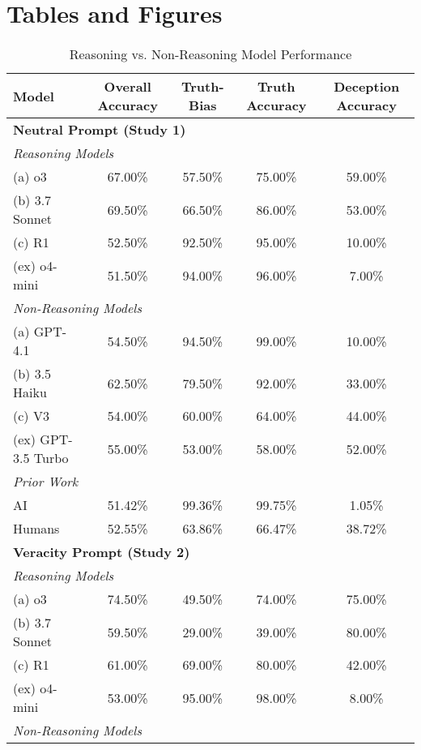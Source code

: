 \documentclass{article}
\begin{document}
\section{Tables and Figures}
\begin{table}[ht]
\centering
\small
\caption{Reasoning vs. Non-Reasoning Model Performance}
\begin{tabular}{lcccc}
\toprule
\textbf{Model} & \textbf{Overall Accuracy} & \textbf{Truth-Bias} & \textbf{Truth Accuracy} & \textbf{Deception Accuracy} \\
\midrule
\multicolumn{5}{l}{\textbf{Neutral Prompt (Study 1)}} \\
\midrule
\multicolumn{5}{l}{\textit{Reasoning Models}} \\
(a) o3 & 67.00\% & 57.50\% & 75.00\% & 59.00\% \\
(b) 3.7 Sonnet & 69.50\% & 66.50\% & 86.00\% & 53.00\% \\
(c) R1 & 52.50\% & 92.50\% & 95.00\% & 10.00\% \\
(ex) o4-mini & 51.50\% & 94.00\% & 96.00\% & 7.00\% \\
\midrule
\multicolumn{5}{l}{\textit{Non-Reasoning Models}} \\
(a) GPT-4.1 & 54.50\% & 94.50\% & 99.00\% & 10.00\% \\
(b) 3.5 Haiku & 62.50\% & 79.50\% & 92.00\% & 33.00\% \\
(c) V3 & 54.00\% & 60.00\% & 64.00\% & 44.00\% \\
(ex) GPT-3.5 Turbo & 55.00\% & 53.00\% & 58.00\% & 52.00\% \\
\midrule
\multicolumn{5}{l}{\textit{Prior Work}\citep{markowitz_generative_2024}} \\
AI & 51.42\% & 99.36\% & 99.75\% & 1.05\% \\
Humans & 52.55\% & 63.86\% & 66.47\% & 38.72\% \\
\midrule
\multicolumn{5}{l}{\textbf{Veracity Prompt (Study 2)}} \\
\midrule
\multicolumn{5}{l}{\textit{Reasoning Models}} \\
(a) o3 & 74.50\% & 49.50\% & 74.00\% & 75.00\% \\
(b) 3.7 Sonnet & 59.50\% & 29.00\% & 39.00\% & 80.00\% \\
(c) R1 & 61.00\% & 69.00\% & 80.00\% & 42.00\% \\
(ex) o4-mini & 53.00\% & 95.00\% & 98.00\% & 8.00\% \\
\midrule
\multicolumn{5}{l}{\textit{Non-Reasoning Models}} \\

\end{tabular}
\end{table}
\end{document}
